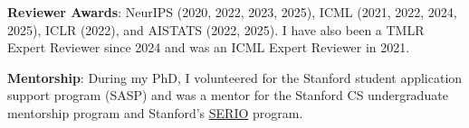 \documentclass[10pt]{article}
\begin{document}
\textbf{Reviewer Awards}: NeurIPS (2020, 2022, 2023, 2025), ICML (2021, 2022,
2024, 2025), ICLR (2022), and AISTATS (2022, 2025).
I have also been a TMLR Expert Reviewer since 2024 and was an ICML Expert Reviewer
in 2021.

\textbf{Mentorship}: During my PhD, I volunteered for the Stanford student
application support program (SASP) and
was a mentor for the Stanford CS undergraduate mentorship program and
Stanford's \href{https://serio.stanford.edu}{SERIO} program.


\end{document}

